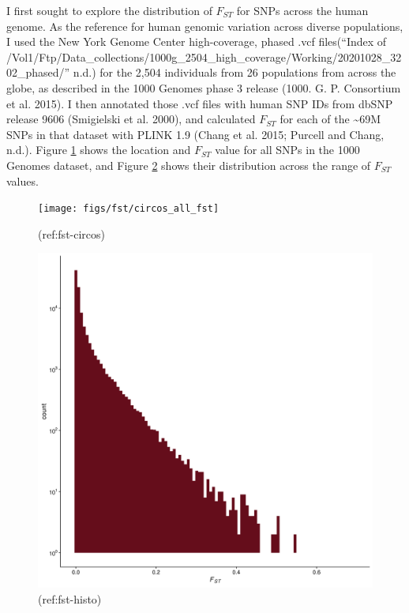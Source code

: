 \documentclass[
]{book}
\begin{document}
I first sought to explore the distribution of \(F_{ST}\) for SNPs across the human genome. As the reference for human genomic variation across diverse populations, I used the New York Genome Center high-coverage, phased .vcf files({``Index of /Vol1/Ftp/Data\_collections/{1000g}\_2504\_high\_coverage/Working/20201028\_3202\_phased/''} n.d.) for the 2,504 individuals from 26 populations from across the globe, as described in the 1000 Genomes phase 3 release (1000. G. P. Consortium et al. 2015). I then annotated those .vcf files with human SNP IDs from dbSNP release 9606 (Smigielski et al. 2000), and calculated \(F_{ST}\) for each of the \textasciitilde69M SNPs in that dataset with PLINK 1.9 (Chang et al. 2015; Purcell and Chang, n.d.). Figure \ref{fig:fst-circos} shows the location and \(F_{ST}\) value for all SNPs in the 1000 Genomes dataset, and Figure \ref{fig:fst-histo} shows their distribution across the range of \(F_{ST}\) values.

\begin{figure}
\texttt{[image: figs/fst/circos\_all\_fst]} \caption{(ref:fst-circos)}\label{fig:fst-circos}
\end{figure}

\begin{figure}
\includegraphics[width=1\linewidth]{figs/fst/histo_fst_all} \caption{(ref:fst-histo)}\label{fig:fst-histo}
\end{figure}
\end{document}
